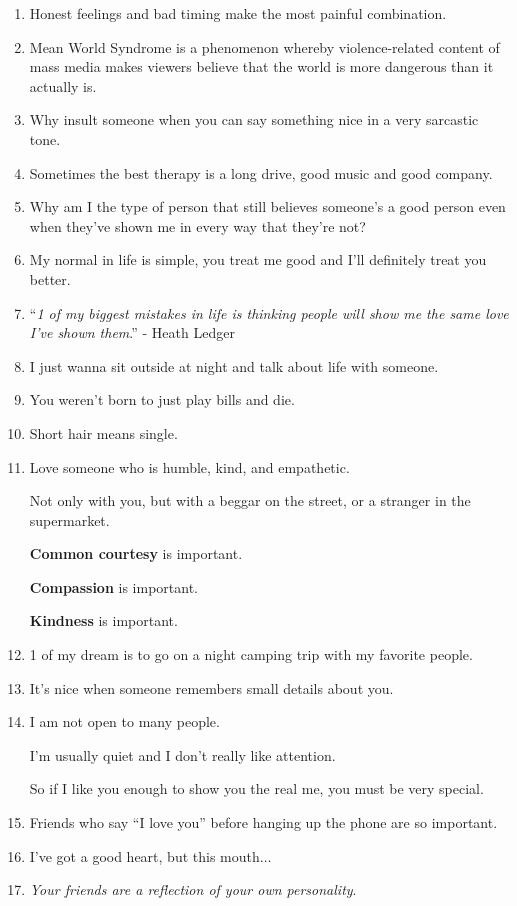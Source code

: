\documentclass{article}
\numberwithin{equation}{section}
\begin{document}
\begin{enumerate}
    ``\textit{Diamond don't shine idiot, they reflect}.'' - Albert Einstein
    \item Honest feelings and bad timing make the most painful combination.
    \item Mean World Syndrome is a phenomenon whereby violence-related content of mass media makes viewers believe that the world is more dangerous than it actually is.
    \item Why insult someone when you can say something nice in a very sarcastic tone.
    \item Sometimes the best therapy is a long drive, good music and good company.
    \item Why am I the type of person that still believes someone's a good person even when they've shown me in every way that they're not?
    \item My normal in life is simple, you treat me good and I'll definitely treat you better.
    \item ``\textit{1 of my biggest mistakes in life is thinking people will show me the same love I've shown them}.'' - Heath Ledger
    \item I just wanna sit outside at night and talk about life with someone.
    \item You weren't born to just play bills and die.
    \item Short hair means single.
    \item Love someone who is humble, kind, and empathetic.
    
    Not only with you, but with a beggar on the street, or a stranger in the supermarket.
    
    \textbf{Common courtesy} is important.
    
    \textbf{Compassion} is important.
    
    \textbf{Kindness} is important.
    \item 1 of my dream is to go on a night camping trip with my favorite people.
    \item It's nice when someone remembers small details about you.
    \item I am not open to many people.
    
    I'm usually quiet and I don't really like attention.
    
    So if I like you enough to show you the real me, you must be very special.
    \item Friends who say ``I love you'' before hanging up the phone are so important.
    \item I've got a good heart, but this mouth$\ldots$
    \item \textit{Your friends are a reflection of your own personality}.
    

\end{enumerate}
\end{document}

